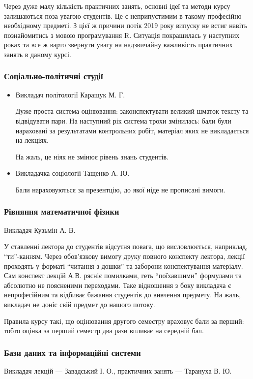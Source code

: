 \documentclass[14pt, a4paper]{extarticle}  %
\begin{document}
Через дуже малу кількість практичних занять, основні ідеї та методи курсу залишаються поза увагою студентів. Це є неприпустимим в такому професійно необхідному предметі. З цієї ж причини потік 2019 року випуску не встиг навіть познайомитись з мовою програмування R. Ситуація покращилась у наступних роках та все ж варто звернути увагу на надзвичайну важливість практичних занять в даному курсі. 

\subsubsection{Соціально-політичні студії}
\begin{itemize}
\item Викладач політології Каращук М. Г.

Дуже проста система оцінювання: законспектувати великий шматок тексту та відвідувати пари. На наступний рік система трохи змінилась: бали були нараховані за результатами контрольних робіт, матеріал яких не викладається на лекціях.

На жаль, це ніяк не змінює рівень знань студентів. 

\item Викладачка соціології Тащенко А. Ю. 

Бали нараховуються за презентцію, до якої ніде не прописані вимоги. 
\end{itemize}

\subsubsection{Рівняння математичної фізики}
Викладач Кузьмін А. В.

У ставленні лектора до студентів відсутня повага, що висловлюється, наприклад, “ти”-канням. Через обов'язкову вимогу друку повного конспекту лектора, лекції проходять у форматі ``читання з дошки'' та заборони конспектування матеріалу. Сам конспект лекцій А.В. рясніє помилками, геть ``поїхавшими'' формулами та абсолютно не поясненими переходами. Таке відношення з боку викладача є непрофесійним та відбиває бажання студентів до вивчення предмету. На жаль, викладач не доніс свій предмет до нашого потоку. 

Правила курсу такі, що оцінювання другого семестру враховує бали за перший: тобто оцінка за перший семестр два рази впливає на середній бал.

\subsubsection{Бази даних та інформаційні системи}
Викладач лекцій --- Завадський І. О., практичних занять --- Тарануха В. Ю.
\end{document}
